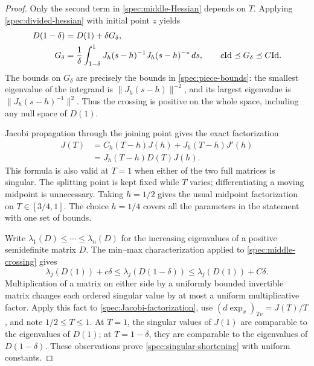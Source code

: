 \begin{proof}
Only the second term in \eqref{spec:middle-Hessian} depends on $T$.
Applying \eqref{spec:divided-hessian} with initial point $z$ yields
\begin{equation}\label{spec:middle-crossing}
\begin{split}
  D(1-\delta)&=D(1)+\delta G_\delta,\\
  G_\delta&=\frac1\delta\int_{1-\delta}^{1}
       J_h(s-h)^{-1}J_h(s-h)^{-*}\,ds,
       \qquad c\mathrm{Id}\preceq G_\delta\preceq C\mathrm{Id}.
\end{split}
\end{equation}
The bounds on $G_\delta$ are precisely the bounds in
\eqref{spec:piece-bounds}: the smallest eigenvalue of the integrand
is $\|J_h(s-h)\|^{-2}$, and its largest eigenvalue is
$\|J_h(s-h)^{-1}\|^2$.  Thus the crossing is positive on the whole
space, including any null space of $D(1)$.

Jacobi propagation through the joining point gives the exact
factorization
\begin{equation}\label{spec:Jacobi-factorization}
\begin{split}
  J(T)
    &=C_h(T-h)J(h)+J_h(T-h)J'(h)\\
    &=J_h(T-h)D(T)J(h).
\end{split}
\end{equation}
This formula is also valid at $T=1$ when either of the two full
matrices is singular.  The splitting point is kept fixed while $T$
varies; differentiating a moving midpoint is unnecessary.  Taking
$h=1/2$ gives the usual midpoint factorization on $T\in[3/4,1]$.
The choice $h=1/4$ covers all the parameters in the statement with
one set of bounds.

Write $\lambda_1(D)\le\cdots\le\lambda_n(D)$ for the increasing
eigenvalues of a positive semidefinite matrix $D$.  The min--max
characterization applied to \eqref{spec:middle-crossing} gives
\[
  \lambda_j(D(1))+c\delta
     \le\lambda_j(D(1-\delta))
     \le\lambda_j(D(1))+C\delta.
\]
Multiplication of a matrix on either side by a uniformly bounded
invertible matrix changes each ordered singular value by at most a
uniform multiplicative factor.  Apply this fact to
\eqref{spec:Jacobi-factorization}, use
$(d\exp_x)_{Tv}=J(T)/T$, and note $1/2\le T\le1$.
At $T=1$, the singular values of $J(1)$ are comparable to the
eigenvalues of $D(1)$; at $T=1-\delta$, they are comparable to the
eigenvalues of $D(1-\delta)$.  These observations prove
\eqref{spec:singular-shortening} with uniform constants.


\end{proof}
